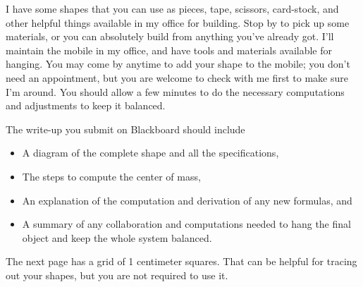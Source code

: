 \documentclass[12pt]{amsart}
\begin{document}
\bigskip

\bigskip

\bigskip

\bigskip

I have some shapes that you can use as pieces, tape, scissors, card-stock, and other helpful things available in my office for building.  Stop by to pick up some materials, or you can absolutely build from anything you've already got.  I'll maintain the mobile in my office, and have tools and materials available for hanging.  You may come by anytime to add your shape to the mobile; you don't need an appointment, but you are welcome to check with me first to make sure I'm around.  You should allow a few minutes to do the necessary computations and adjustments to keep it balanced.

The write-up you submit on Blackboard should include 
\begin{itemize}
\item  A diagram of the complete shape and all the specifications,
\item  The steps to compute the center of mass,
\item  An explanation of the computation and derivation of any new formulas, and
\item  A summary of any collaboration and computations needed to hang the final object and keep the whole system balanced.
\end{itemize}

\bigskip

\bigskip

\bigskip

\bigskip

The next page has a grid of 1 centimeter squares.  That can be helpful for tracing out your shapes, but you are not required to use it.

\newpage


\newpage

%
%
%
%
%
%
%
%
%
%
%
%
% 
%
%
%
%
%
%
%
%
\end{document}
